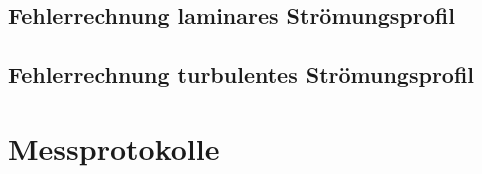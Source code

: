\clearpage
\subsection{Fehlerrechnung laminares Str\"omungsprofil}
\label{app:python:errorLaminar}


\clearpage
\subsection{Fehlerrechnung turbulentes Str\"omungsprofil}
\label{app:python:errorTurbulent}


\clearpage
\section{Messprotokolle}
\label{app:messprotokolle}
%

